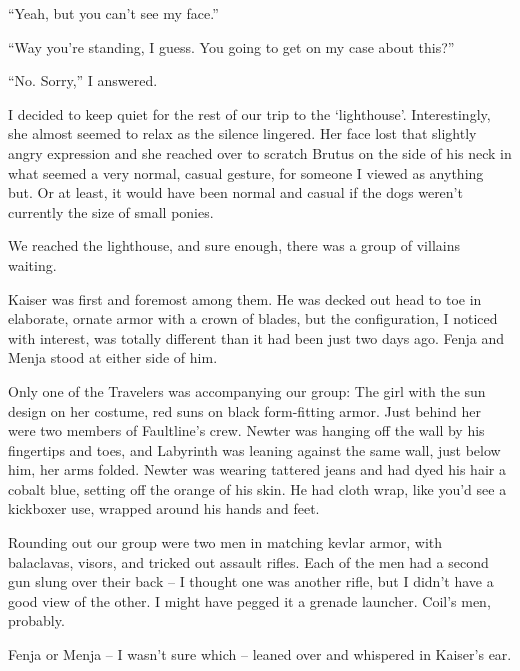 ``Yeah, but you can't see my face.''



``Way you're standing, I guess.  You going to get on my case about this?''



``No.  Sorry,'' I answered.



I decided to keep quiet for the rest of our trip to the `lighthouse'.  Interestingly, she almost seemed to relax as the silence lingered.  Her face lost that slightly angry expression and she reached over to scratch Brutus on the side of his neck in what seemed a very normal, casual gesture, for someone I viewed as anything but.  Or at least, it would have been normal and casual if the dogs weren't currently the size of small ponies.



We reached the lighthouse, and sure enough, there was a group of villains waiting.



Kaiser was first and foremost among them.  He was decked out head to toe in elaborate, ornate armor with a crown of blades, but the configuration, I noticed with interest, was totally different than it had been just two days ago.  Fenja and Menja stood at either side of him.



Only one of the Travelers was accompanying our group: The girl with the sun design on her costume, red suns on black form-fitting armor.  Just behind her were two members of Faultline's crew. Newter was hanging off the wall by his fingertips and toes, and Labyrinth was leaning against the same wall, just below him, her arms folded.  Newter was wearing tattered jeans and had dyed his hair a cobalt blue, setting off the orange of his skin.  He had cloth wrap, like you'd see a kickboxer use, wrapped around his hands and feet.



Rounding out our group were two men in matching kevlar armor, with balaclavas, visors, and tricked out assault rifles.  Each of the men had a second gun slung over their back – I thought one was another rifle, but I didn't have a good view of the other.  I might have pegged it a grenade launcher.  Coil's men, probably.



Fenja or Menja – I wasn't sure which – leaned over and whispered in Kaiser's ear.



